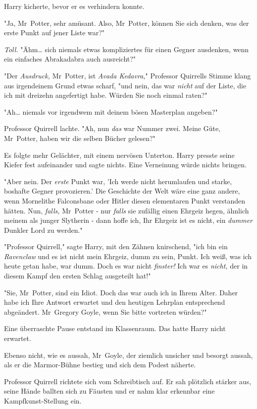 {Harry kicherte, bevor er es verhindern konnte.

"Ja, Mr~Potter, sehr amüsant. Also, Mr~Potter, können Sie sich denken, was der erste Punkt auf jener Liste war?"

\emph{Toll.} "Ähm… sich niemals etwas kompliziertes für einen Gegner ausdenken, wenn ein einfaches Abrakadabra auch ausreicht?"

"Der \emph{Ausdruck,} Mr~Potter, ist \emph{Avada Kedavra,}" Professor Quirrells Stimme klang aus irgendeinem Grund etwas scharf, "und nein, das war \emph{nicht} auf der Liste, die ich mit dreizehn angefertigt habe. Würden Sie noch einmal raten?"

"Ah… niemals vor irgendwem mit deinem bösen Masterplan angeben?"

Professor Quirrell lachte. "Ah, nun \emph{das} war Nummer zwei. Meine Güte, Mr~Potter, haben wir die selben Bücher gelesen?"

Es folgte mehr Gelächter, mit einem nervösen Unterton. Harry presste seine Kiefer fest aufeinander und sagte nichts. Eine Verneinung würde nichts bringen.

"Aber nein. Der \emph{erste} Punkt war, 'Ich werde nicht herumlaufen und starke, boshafte Gegner provozieren.' Die Geschichte der Welt wäre eine ganz andere, wenn Mornelithe Falconsbane oder Hitler diesen elementaren Punkt verstanden hätten. Nun, \emph{falls,} Mr~Potter - nur \emph{falls} sie zufällig einen Ehrgeiz hegen, ähnlich meinem als junger Slytherin - dann hoffe ich, Ihr Ehrgeiz ist es nicht, ein \emph{dummer} Dunkler Lord zu werden."

"Professor Quirrell," sagte Harry, mit den Zähnen knirschend, "ich bin ein \emph{Ravenclaw} und es ist nicht mein Ehrgeiz, dumm zu sein, Punkt. Ich weiß, was ich heute getan habe, war dumm. Doch es war nicht \emph{finster!} Ich war es \emph{nicht,} der in diesem Kampf den ersten Schlag ausgeteilt hat!"

"Sie, Mr~Potter, sind ein Idiot. Doch das war auch ich in Ihrem Alter. Daher habe ich Ihre Antwort erwartet und den heutigen Lehrplan entsprechend abgeändert. Mr~Gregory Goyle, wenn Sie bitte vortreten würden?"

Eine überraschte Pause entstand im Klassenraum. Das hatte Harry nicht erwartet.

Ebenso nicht, wie es aussah, Mr~Goyle, der ziemlich unsicher und besorgt aussah, als er die Marmor-Bühne bestieg und sich dem Podest näherte.

Professor Quirrell richtete sich vom Schreibtisch auf. Er sah plötzlich stärker aus, seine Hände ballten sich zu Fäusten und er nahm klar erkennbar eine Kampfkunst-Stellung ein.

}
